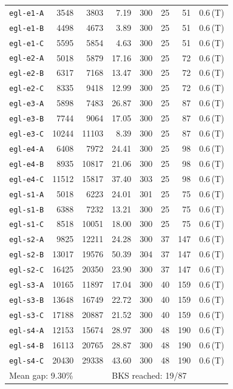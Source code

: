 \begin{longtable}{lrrrrrrl}
\texttt{egl-e1-A} & 3548 & 3803 & 7.19 & 300 & 25 & 51 & 0.6\,(T) \\
\texttt{egl-e1-B} & 4498 & 4673 & 3.89 & 300 & 25 & 51 & 0.6\,(T) \\
\texttt{egl-e1-C} & 5595 & 5854 & 4.63 & 300 & 25 & 51 & 0.6\,(T) \\
\texttt{egl-e2-A} & 5018 & 5879 & 17.16 & 300 & 25 & 72 & 0.6\,(T) \\
\texttt{egl-e2-B} & 6317 & 7168 & 13.47 & 300 & 25 & 72 & 0.6\,(T) \\
\texttt{egl-e2-C} & 8335 & 9418 & 12.99 & 300 & 25 & 72 & 0.6\,(T) \\
\texttt{egl-e3-A} & 5898 & 7483 & 26.87 & 300 & 25 & 87 & 0.6\,(T) \\
\texttt{egl-e3-B} & 7744 & 9064 & 17.05 & 300 & 25 & 87 & 0.6\,(T) \\
\texttt{egl-e3-C} & 10244 & 11103 & 8.39 & 300 & 25 & 87 & 0.6\,(T) \\
\texttt{egl-e4-A} & 6408 & 7972 & 24.41 & 300 & 25 & 98 & 0.6\,(T) \\
\texttt{egl-e4-B} & 8935 & 10817 & 21.06 & 300 & 25 & 98 & 0.6\,(T) \\
\texttt{egl-e4-C} & 11512 & 15817 & 37.40 & 303 & 25 & 98 & 0.6\,(T) \\
\texttt{egl-s1-A} & 5018 & 6223 & 24.01 & 301 & 25 & 75 & 0.6\,(T) \\
\texttt{egl-s1-B} & 6388 & 7232 & 13.21 & 300 & 25 & 75 & 0.6\,(T) \\
\texttt{egl-s1-C} & 8518 & 10051 & 18.00 & 300 & 25 & 75 & 0.6\,(T) \\
\texttt{egl-s2-A} & 9825 & 12211 & 24.28 & 300 & 37 & 147 & 0.6\,(T) \\
\texttt{egl-s2-B} & 13017 & 19576 & 50.39 & 304 & 37 & 147 & 0.6\,(T) \\
\texttt{egl-s2-C} & 16425 & 20350 & 23.90 & 300 & 37 & 147 & 0.6\,(T) \\
\texttt{egl-s3-A} & 10165 & 11897 & 17.04 & 300 & 40 & 159 & 0.6\,(T) \\
\texttt{egl-s3-B} & 13648 & 16749 & 22.72 & 300 & 40 & 159 & 0.6\,(T) \\
\texttt{egl-s3-C} & 17188 & 20887 & 21.52 & 300 & 40 & 159 & 0.6\,(T) \\
\texttt{egl-s4-A} & 12153 & 15674 & 28.97 & 300 & 48 & 190 & 0.6\,(T) \\
\texttt{egl-s4-B} & 16113 & 20765 & 28.87 & 300 & 48 & 190 & 0.6\,(T) \\
\texttt{egl-s4-C} & 20430 & 29338 & 43.60 & 300 & 48 & 190 & 0.6\,(T) \\
\midrule
\multicolumn{3}{l}{Mean gap: 9.30\%} & \multicolumn{5}{l}{BKS reached: 19/87} \\
\end{longtable}
\endgroup